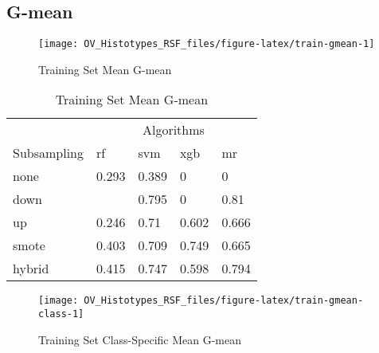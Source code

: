 \documentclass[
]{report}
\begin{document}
\subsection{G-mean}\label{g-mean}

\begin{figure}[H]

{\centering \texttt{[image: OV\_Histotypes\_RSF\_files/figure-latex/train-gmean-1]} 

}

\caption{Training Set Mean G-mean}\label{fig:train-gmean}
\end{figure}

\begin{table}

\caption{\label{tab:train-gmean-table}Training Set Mean G-mean}
\centering
\begin{tabular}[t]{l|l|l|l|l}
\hline
\multicolumn{1}{c|}{ } & \multicolumn{4}{c}{Algorithms} \\
\cline{2-5}
Subsampling & rf & svm & xgb & mr\\
\hline
none & 0.293 & 0.389 & 0 & 0\\
\hline
down & \cellcolor[HTML]{90ee90}{0.815} & 0.795 & 0 & 0.81\\
\hline
up & 0.246 & 0.71 & 0.602 & 0.666\\
\hline
smote & 0.403 & 0.709 & 0.749 & 0.665\\
\hline
hybrid & 0.415 & 0.747 & 0.598 & 0.794\\
\hline
\end{tabular}
\end{table}

\begin{figure}[H]

{\centering \texttt{[image: OV\_Histotypes\_RSF\_files/figure-latex/train-gmean-class-1]} 

}

\caption{Training Set Class-Specific Mean G-mean}\label{fig:train-gmean-class}
\end{figure}
\end{document}
